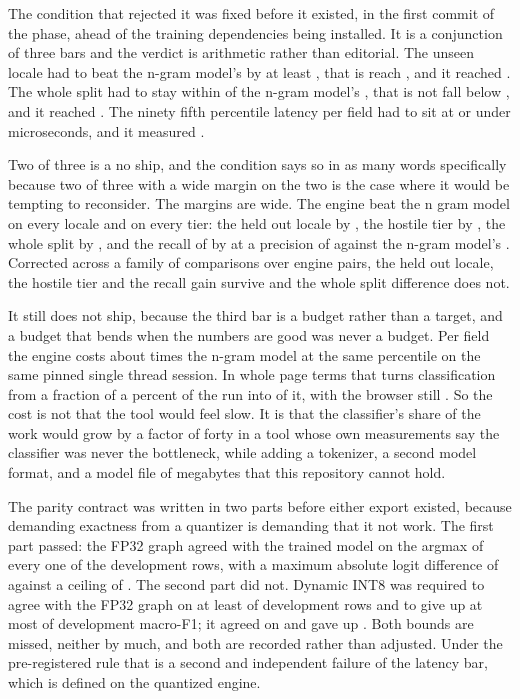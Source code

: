 The condition that rejected it was fixed before it existed, in the first commit
of the phase, ahead of the training dependencies being installed. It is a
conjunction of three bars and the verdict is arithmetic rather than editorial.
The unseen locale had to beat the n-gram model's \vNgramUnseenMacroF{} by at
least \vBertUnseenMargin{}, that is reach \vBertBarUnseen{}, and it reached
\vBertUnseenMacroF{}. The whole split had to stay within \vBertOverallTolerance{}
of the n-gram model's \vNgramMacroF{}, that is not fall below \vBertBarOverall{},
and it reached \vBertMacroF{}. The ninety fifth percentile latency per field had
to sit at or under \vBertBarLatency{} microseconds, and it measured
\vBertLatencyNinetyFive{}.

Two of three is a no ship, and the condition says so in as many words
specifically because two of three with a wide margin on the two is the case where
it would be tempting to reconsider. The margins are wide. The engine beat the n
gram model on every locale and on every tier: the held out locale by
\vBertUnseenGain{}, the hostile tier by \vBertHostileGain{}, the whole split by
\vBertOverallGain{}, and the recall of  by
\vBertMissingRecallGain{} at a precision of \vBertMissingPrecision{} against the
n-gram model's \vNgramMissingPrecision{}. Corrected across a family of
\vBertFamilySize{} comparisons over \vBertPairs{} engine pairs, the held out
locale, the hostile tier and the recall gain survive and the whole split
difference does not.

It still does not ship, because the third bar is a budget rather than a target,
and a budget that bends when the numbers are good was never a budget. Per field
the engine costs about \vBertLatencyRatio{} times the n-gram model at the same
percentile on the same pinned single thread session. In whole page terms that
turns classification from a fraction of a percent of the run into
\vBertClassifyShare{} of it, with the browser still \vBertLoadShare{}. So the
cost is not that the tool would feel slow. It is that the classifier's share of
the work would grow by a factor of forty in a tool whose own measurements say the
classifier was never the bottleneck, while adding a tokenizer, a second model
format, and a model file of \vBertIntEightMegabytes{} megabytes that this
repository cannot hold.

The parity contract was written in two parts before either export existed,
because demanding exactness from a quantizer is demanding that it not work. The
first part passed: the FP32 graph agreed with the trained model on the argmax of
every one of the \vBertParityRows{} development rows, with a maximum absolute
logit difference of \vBertParityDelta{} against a ceiling of
\vBertParityTolerance{}. The second part did not. Dynamic INT8 was required to
agree with the FP32 graph on at least \vBertIntEightAgreementBar{} of development
rows and to give up at most \vBertIntEightDropBar{} of development macro-F1; it
agreed on \vBertIntEightAgreement{} and gave up \vBertIntEightDrop{}. Both bounds
are missed, neither by much, and both are recorded rather than adjusted. Under
the pre-registered rule that is a second and independent failure of the latency
bar, which is defined on the quantized engine.

